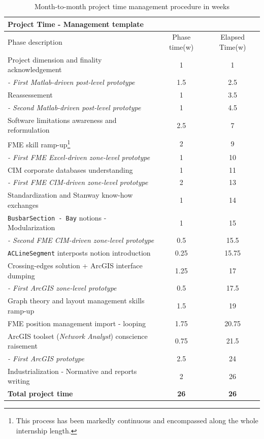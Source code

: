 \begin{table}[h] \centering
\label{tab:margenes}
\caption{Month-to-month project time management procedure in weeks}
\begin{tabular}{lcc}
\toprule
\textbf{Project Time - Management template}  & & \\ \toprule
Phase description & Phase time(w) & Elapsed Time(w) \\ \midrule
Project dimension and finality acknowledgement & 1 & 1 \\
\textit{- First Matlab-driven post-level prototype} 	& 1.5 & 2.5\\
Reassessement & 1 & 3.5\\ \midrule
\textit{- Second Matlab-driven post-level prototype} & 1 & 4.5 \\
Software limitations awareness and reformulation &	2.5 & 7 \\ \midrule
FME skill ramp-up\footnote{This process has been markedly continuous and encompassed along the whole internship length.} &	2 & 9\\
\textit{- First FME Excel-driven zone-level prototype} & 1 & 10 \\
CIM corporate databases understanding &	1 & 11\\
\textit{- First FME CIM-driven zone-level prototype} & 2 & 13 \\ \midrule 
Standardization and Stanway know-how exchanges &	1 & 14 \\
\texttt{BusbarSection - Bay} notions - Modularization &	1 & 15\\
\textit{- Second FME CIM-driven zone-level prototype}& 0.5 & 15.5\\
\texttt{ACLineSegment} interposts notion introduction  & 0.25 & 15.75\\
Crossing-edges solution + ArcGIS interface dumping &	1.25 & 17\\ \midrule
\textit{- First ArcGIS zone-level prototype}&	0.5 & 17.5\\
Graph theory and layout management skills ramp-up & 1.5 & 19\\ 
FME position management import - looping &	1.75 & 20.75\\ \midrule
ArcGIS toolset (\textit{Network Analyst}) conscience raisement &	0.75 & 21.5\\ 
\textit{- First ArcGIS prototype} & 2.5 & 24\\ \midrule
Industrialization - Normative and reports writing & 2 & 26 \\
\midrule
\textbf{Total project time}& \textbf{26} &\textbf{26} \\
\bottomrule 
\end{tabular}
\end{table}


